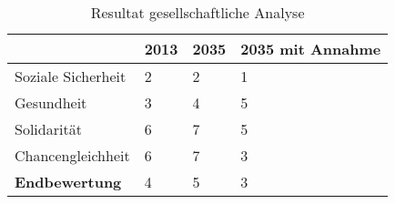 \begin{table}[h]
    \centering
    \begin{tabular}{l|lll} & \textbf{2013} & \textbf{2035} &  \textbf{2035 mit Annahme} 
        \\ \hline Soziale Sicherheit    & 2  & 2  & 1
        \\ Gesundheit                   & 3  & 4  & 5
        \\ Solidarität                  & 6  & 7  & 5
        \\ Chancengleichheit            & 6  & 7  & 3
        \\ \hline \textbf{Endbewertung} & 4  & 5  & 3
    \end{tabular}
    \caption{Resultat gesellschaftliche Analyse}
\end{table}
